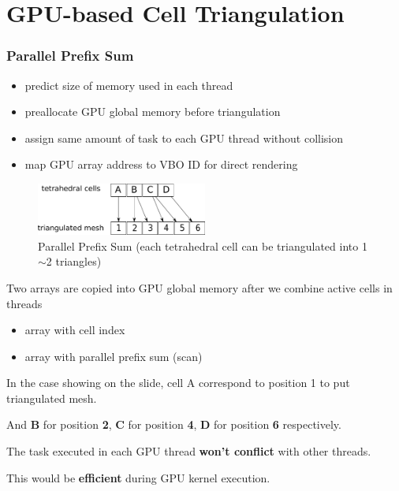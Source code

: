 \documentclass[8pt]{beamer}
\begin{document}
\section{GPU-based Cell Triangulation}

\begin{frame}
  \frametitle{Parallel Prefix Sum}
  \begin{itemize}
  \item predict size of memory used in each thread
  \item preallocate GPU global memory before triangulation
  \item assign same amount of task to each GPU thread without collision
  \item map GPU array address to VBO ID for direct rendering
  \end{itemize}
  \begin{figure}[H]
    \centering
    \includegraphics[width=0.5\textwidth]{images/scan.pdf}
    \caption{Parallel Prefix Sum (each tetrahedral cell can be triangulated into 1$\sim$2 triangles)}
  \end{figure}
\end{frame}
\note
{
  Two arrays are copied into GPU global memory after we combine active cells in threads
  \begin{itemize}
  \item array with cell index
  \item array with parallel prefix sum (scan)
  \end{itemize}
  In the case showing on the slide, cell A correspond to position 1 to put triangulated mesh.

  And \textbf{B} for position \textbf{2}, \textbf{C} for position \textbf{4}, 
  \textbf{D} for position \textbf{6} respectively.

  The task executed in each GPU thread \textbf{won't conflict} with other threads.
  
  This would be \textbf{efficient} during GPU kernel execution.
}
\end{document}
